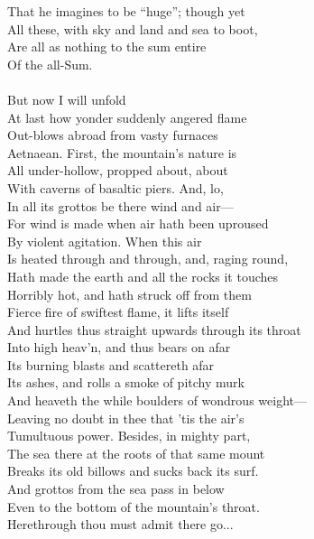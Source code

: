 That he imagines to be ``huge''; though yet\\
All these, with sky and land and sea to boot,\\
Are all as nothing to the sum entire\\
Of the all-Sum.\\
\\
But now I will unfold\\
At last how yonder suddenly angered flame\\
Out-blows abroad from vasty furnaces\\
Aetnaean. First, the mountain's nature is\\
All under-hollow, propped about, about\\
With caverns of basaltic piers. And, lo,\\
In all its grottos be there wind and air—\\
For wind is made when air hath been uproused\\
By violent agitation. When this air\\
Is heated through and through, and, raging round,\\
Hath made the earth and all the rocks it touches\\
Horribly hot, and hath struck off from them\\
Fierce fire of swiftest flame, it lifts itself\\
And hurtles thus straight upwards through its throat\\
Into high heav'n, and thus bears on afar\\
Its burning blasts and scattereth afar\\
Its ashes, and rolls a smoke of pitchy murk\\
And heaveth the while boulders of wondrous weight—\\
Leaving no doubt in thee that 'tis the air's\\
Tumultuous power. Besides, in mighty part,\\
The sea there at the roots of that same mount\\
Breaks its old billows and sucks back its surf.\\
And grottos from the sea pass in below\\
Even to the bottom of the mountain's throat.\\
Herethrough thou must admit there go...

